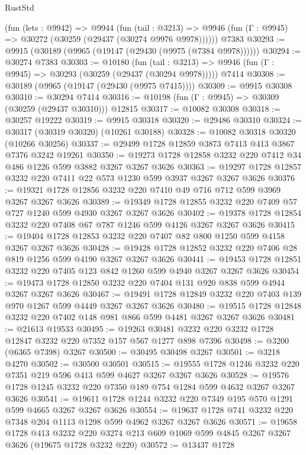 \begin{lexlean}{RustStd}
\begin{coremodule}
{\begin{coremodule}
{{{{{{{{{{{{{{{{{{{{{{{{{    (fun (lets : @9942) =>
    @9944
      (fun (tail : @3213) =>
      @9946 (fun (Γ : @9945) => @30272 (@30259 (@29437 (@30274 @9976 @9978))))))
    @7383
@30293 := @9915 (@30189 (@9965 (@19147 (@29430 (@9975 (@7384 @9978))))))
@30294 := @30274 @7383
@30303 := @10180
    (fun (tail : @3213) => @9946 (fun (Γ : @9945) => @30293 (@30259 (@29437 (@30294 @9978)))))
    @7414
@30308 := @30189 (@9965 (@19147 (@29430 (@9975 @7415))))
@30309 := @9915 @30308
@30310 := @30294 @7414
@30316 := @10198 (fun (Γ : @9945) => @30309 (@30259 (@29437 @30310))) @12815
@30317 := @10082 @30308
@30318 := @30257 @19222
@30319 := @9915 @30318
@30320 := @29486 @30310
@30324 := @30317 (@30319 @30320) (@10261 @30188)
@30328 := @10082 @30318 @30320 (@10266 @30256)
@30337 := @29499 @1728 @12859 @3873 @7413 @413 @3867 @7376 @3242 @19261
@30350 := @19273 @1728 @12858 @3232 @220 @7412 @34 @486 @1226 @599 @3882 @3267 @3267 @3626
@30363 := @19297 @1728 @12857 @3232 @220 @7411 @22 @573 @1230 @599 @3937 @3267 @3267 @3626
@30376 := @19321 @1728 @12856 @3232 @220 @7410 @49 @716 @712 @599 @3969 @3267 @3267 @3626
@30389 := @19349 @1728 @12855 @3232 @220 @7409 @57 @727 @1240 @599 @4930 @3267 @3267 @3626
@30402 := @19378 @1728 @12854 @3232 @220 @7408 @67 @787 @1246 @599 @4126 @3267 @3267 @3626
@30415 := @19404 @1728 @12853 @3232 @220 @7407 @82 @800 @1250 @599 @4158 @3267 @3267 @3626
@30428 := @19428 @1728 @12852 @3232 @220 @7406 @28 @819 @1256 @599 @4190 @3267 @3267 @3626
@30441 := @19453 @1728 @12851 @3232 @220 @7405 @123 @842 @1260 @599 @4940 @3267 @3267 @3626
@30454 := @19473 @1728 @12850 @3232 @220 @7404 @131 @920 @838 @599 @4944 @3267 @3267 @3626
@30467 := @19491 @1728 @12849 @3232 @220 @7403 @139 @970 @1267 @599 @4449 @3267 @3267 @3626
@30480 := @19515 @1728 @12848 @3232 @220 @7402 @148 @981 @866 @599 @4481 @3267 @3267 @3626
@30481 := @21613 @19533
@30495 := @19263 @30481 @3232 @220 @3232 @1728 @12847 @3232 @220 @7352 @157 @567 @1277 @898 @7396
@30498 := @3200 (@6365 @7398) @3267
@30500 := @30495 @30498 @3267
@30501 := @3218 @4270
@30502 := @30500 @30501
@30515 := @19555 @1728 @1246 @3232 @220 @7351 @219 @596 @413 @599 @4627 @3267 @3267 @3626
@30528 := @19576 @1728 @1245 @3232 @220 @7350 @189 @754 @1284 @599 @4632 @3267 @3267 @3626
@30541 := @19611 @1728 @1244 @3232 @220 @7349 @195 @570 @1291 @599 @4665 @3267 @3267 @3626
@30554 := @19637 @1728 @741 @3232 @220 @7348 @204 @1113 @1298 @599 @4962 @3267 @3267 @3626
@30571 := @19658
    @1728
    @413
    @3232
    @220
    @3274
    @213
    @609
    @1069
    @599
    @4845
    @3267
    @3267
    @3626
    (@19675 @1728 @3232 @220)
@30572 := @13437 @1728
}}}}}}}}}}}}}}}}}}}}}}}}}
\end{coremodule}}
\end{coremodule}
\end{lexlean}
